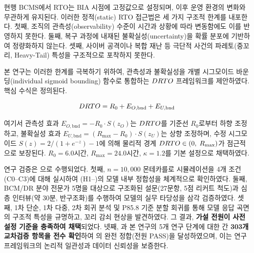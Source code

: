 \section{}
\label{sec:conclusion-summary}

현행 BCMS에서 RTO는 BIA 시점에
고정값으로 설정되며, 이후 운영 환경의 변화와 무관하게 유지된다.
이러한 정적(static) RTO 접근법은 세 가지 구조적 한계를 내포한다.
첫째, 조직의 관측성(observability) 수준이 시간과 상황에 따라 변동함에도
이를 반영하지 못한다.
둘째, 복구 과정에 내재된 불확실성(uncertainty)을 확률 분포에 기반하여
정량화하지 않는다.
셋째, 사이버 공격이나 복합 재난 등 극단적 사건의 파레토(중꼬리, Heavy-Tail) 특성을
구조적으로 포착하지 못한다.

본 연구는 이러한 한계를 극복하기 위하여, 관측성과 불확실성을
개별 시그모이드 바운딩(individual sigmoid bounding) 함수로 통합하는
$DRTO$ 프레임워크를 제안하였다.
핵심 수식은  정의된다.

\begin{equation}
  DRTO = R_0 + E_{O,\text{bnd}} + E_{U,\text{bnd}}
  \label{eq:ch7-drto-core}
\end{equation}

\noindent
여기서 관측성 효과 $E_{O,\text{bnd}} = -R_0 \cdot S(z_O)$는
$DRTO$를 기준선 $R_0$로부터 하향 조정하고,
불확실성 효과 $E_{U,\text{bnd}} = (R_{\max} - R_0) \cdot S(z_U)$는
상향 조정하며, 수정 시그모이드 $S(z) = 2/(1 + e^{-z}) - 1$에 의해
물리적 경계 $DRTO \in (0,\; R_{\max})$가 점근적으로 보장된다.
$R_0 = 6.0$시간, $R_{\max} = 24.0$시간, $\kappa = 1.2$를 기본 설정으로 채택하였다.

연구 검증은 으로 수행되었다.
첫째, $n = 10{,}000$ 몬테카를로 시뮬레이션을 4개 조건(C0--C3)에 대해
실시하여 (H1--)의 모델 내부 정합성을 체계적으로 확인하였다.
둘째, BCM/DR 분야 전문가 5명을 대상으로 구조화된 설문(27문항, 5점 리커트 척도)과
심층 인터뷰(약 30분, 반구조화)를 수행하여 모델의 실무 타당성을 삼각 검증하였다.
셋째, 1차 단순, 1차 다중, 2차 회귀 분석 및 P85.8 기준 분할 회귀를 통해
모델 응답 곡면의 구조적 특성을 규명하고, 꼬리 감쇠 현상을 발견하였다.
그 결과, \textbf{ 가설 전원이 사전 설정 기준을 충족하여 채택}되었다.
넷째, 과 본 연구의 5개 연구 단계에 대한
 간
\textbf{303개 교차검증 항목을 전수 확인}하여
의 완전 정합(전원 PASS)을 달성하였으며,
이는 연구 프레임워크의 논리적 일관성과 데이터 신뢰성을 보증한다.


